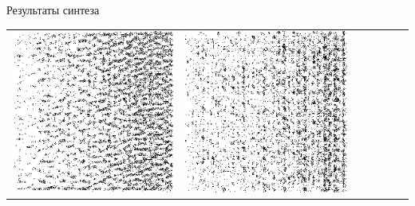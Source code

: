 \documentclass[12pt]{beamer}
\begin{document}
\begin{frame}{Результаты синтеза}
\begin{table}
\begin{center}
\begin{tabular}{p{1.2cm} p{1.2cm} p{1.2cm} p{1.2cm} p{1.2cm} p{1.2cm} p{1.2cm}}
					\includegraphics[width=1\linewidth]{8-results/sand-trend8/nf64e5/gen2}
					&
					\includegraphics[width=1\linewidth]{8-results/sand-trend8/nf64e10/gen2}
					\\

\end{tabular}
\end{center}
\end{table}
\end{frame}
\end{document}
